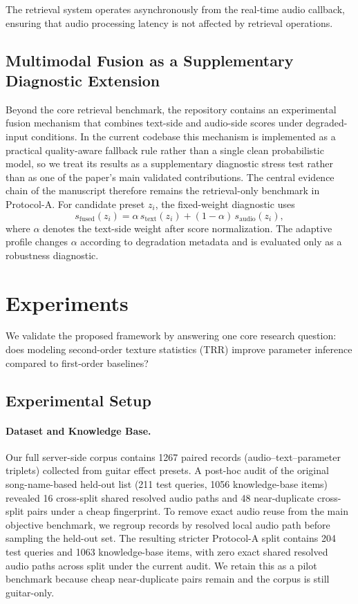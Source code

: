 The retrieval system operates asynchronously from the real-time audio callback, ensuring that audio processing latency is not affected by retrieval operations.

\subsection{Multimodal Fusion as a Supplementary Diagnostic Extension}
\label{ssec:fusion}

Beyond the core retrieval benchmark, the repository contains an experimental fusion mechanism that combines text-side and audio-side scores under degraded-input conditions. In the current codebase this mechanism is implemented as a practical quality-aware fallback rule rather than a single clean probabilistic model, so we treat its results as a supplementary diagnostic stress test rather than as one of the paper's main validated contributions. The central evidence chain of the manuscript therefore remains the retrieval-only benchmark in Protocol-A.
For candidate preset $z_i$, the fixed-weight diagnostic uses
\begin{equation}
	s_{\mathrm{fused}}(z_i)=\alpha\,s_{\mathrm{text}}(z_i)+(1-\alpha)\,s_{\mathrm{audio}}(z_i),
\end{equation}
where $\alpha$ denotes the text-side weight after score normalization. The adaptive profile changes $\alpha$ according to degradation metadata and is evaluated only as a robustness diagnostic.

\section{Experiments}
\label{sec:experiments}

We validate the proposed framework by answering one core research question: does modeling second-order texture statistics (TRR) improve parameter inference compared to first-order baselines?

\subsection{Experimental Setup}

\paragraph{Dataset and Knowledge Base.}
Our full server-side corpus contains 1267 paired records (audio--text--parameter triplets) collected from guitar effect presets. A post-hoc audit of the original song-name-based held-out list (211 test queries, 1056 knowledge-base items) revealed 16 cross-split shared resolved audio paths and 48 near-duplicate cross-split pairs under a cheap fingerprint. To remove exact audio reuse from the main objective benchmark, we regroup records by resolved local audio path before sampling the held-out set. The resulting stricter Protocol-A split contains 204 test queries and 1063 knowledge-base items, with zero exact shared resolved audio paths across split under the current audit. We retain this as a pilot benchmark because cheap near-duplicate pairs remain and the corpus is still guitar-only.

